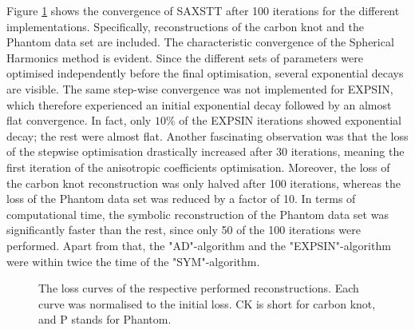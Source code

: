 Figure \ref{fig:Loss_curve_optimal} shows the convergence of SAXSTT after 100 iterations for the different implementations.
Specifically, reconstructions of the carbon knot and the Phantom data set are included.
The characteristic convergence of the Spherical Harmonics method is evident.
Since the different sets of parameters were optimised independently before the final optimisation, several exponential decays are visible.
The same step-wise convergence was not implemented for EXPSIN, which therefore experienced an initial exponential decay followed by an almost flat convergence.
In fact, only $10\%$ of the EXPSIN iterations showed exponential decay; the rest were almost flat.
Another fascinating observation was that the loss of the stepwise optimisation drastically increased after 30 iterations, meaning the first iteration of the anisotropic coefficients optimisation.
Moreover, the loss of the carbon knot reconstruction was only halved after 100 iterations, whereas the loss of the Phantom data set was reduced by a factor of 10.
In terms of computational time, the symbolic reconstruction of the Phantom data set was significantly faster than the rest, since only 50 of the 100 iterations were performed.
Apart from that, the "AD"-algorithm and the "EXPSIN"-algorithm were within twice the time of the "SYM"-algorithm.



\begin{figure}[h!]
    \centering
    \caption[Loss Curves of Reconstructions]{ The loss curves of the respective performed reconstructions. Each curve was normalised to the initial loss.
        CK is short for carbon knot, and P stands for Phantom. }
    \label{fig:Loss_curve_optimal}
\end{figure}